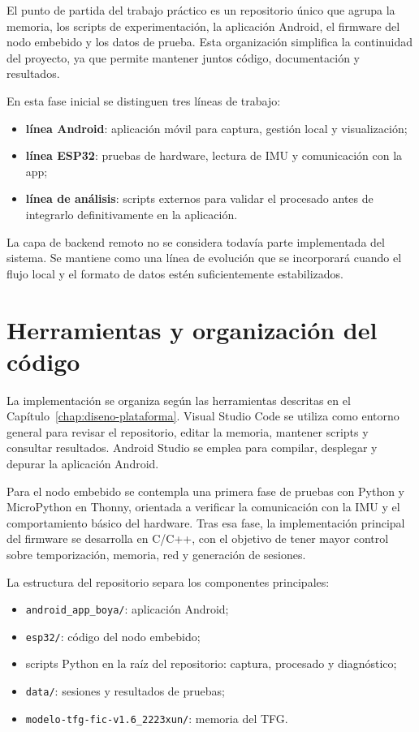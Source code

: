 El punto de partida del trabajo práctico es un repositorio único que agrupa la memoria, los scripts de experimentación, la aplicación Android, el firmware del nodo embebido y los datos de prueba. Esta organización simplifica la continuidad del proyecto, ya que permite mantener juntos código, documentación y resultados.

En esta fase inicial se distinguen tres líneas de trabajo:

\begin{itemize}
  \item \textbf{línea Android}: aplicación móvil para captura, gestión local y visualización;
  \item \textbf{línea ESP32}: pruebas de hardware, lectura de IMU y comunicación con la app;
  \item \textbf{línea de análisis}: scripts externos para validar el procesado antes de integrarlo definitivamente en la aplicación.
\end{itemize}

La capa de backend remoto no se considera todavía parte implementada del sistema. Se mantiene como una línea de evolución que se incorporará cuando el flujo local y el formato de datos estén suficientemente estabilizados.

\section{Herramientas y organización del código}

La implementación se organiza según las herramientas descritas en el Capítulo~\ref{chap:diseno-plataforma}. Visual Studio Code se utiliza como entorno general para revisar el repositorio, editar la memoria, mantener scripts y consultar resultados. Android Studio se emplea para compilar, desplegar y depurar la aplicación Android.

Para el nodo embebido se contempla una primera fase de pruebas con Python y MicroPython en Thonny, orientada a verificar la comunicación con la IMU y el comportamiento básico del hardware. Tras esa fase, la implementación principal del firmware se desarrolla en C/C++, con el objetivo de tener mayor control sobre temporización, memoria, red y generación de sesiones.

La estructura del repositorio separa los componentes principales:

\begin{itemize}
  \item \texttt{android\_app\_boya/}: aplicación Android;
  \item \texttt{esp32/}: código del nodo embebido;
  \item scripts Python en la raíz del repositorio: captura, procesado y diagnóstico;
  \item \texttt{data/}: sesiones y resultados de pruebas;
  \item \texttt{modelo-tfg-fic-v1.6\_2223xun/}: memoria del TFG.
\end{itemize}

